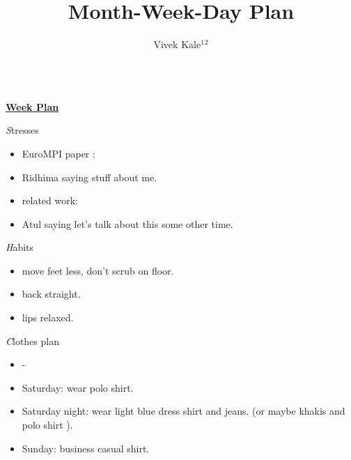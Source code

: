 \documentclass[serif,mathserif,final]{beamer}
\title{Month-Week-Day Plan}
\author{Vivek Kale$^1$$^2$}
\institute{$^1$ University of Illinois at Urbana-Champaign \quad}
\begin{document}
 
\begin{frame}{}
  \begin{columns}[t]


\begin{column}{0.27\linewidth} {\textbf{\underline{Week Plan}}} 

  \begin{block}{\textit Stresses} 
    \begin{itemize}
    \item \small EuroMPI paper : 
      \small \item \small Ridhima saying stuff about me. 
    \item \small related work:   
    \item \small Atul saying let's talk about this some other time. 
    \end{itemize} 
  \end{block} 

  \begin{block}{\textit Habits } 
    \begin{itemize} 
      \small \item \small move feet less, don't scrub on floor. 
    \item \small back straight. 
    \item \small lips relaxed. 
    \end{itemize} 
  \end{block} 

  \begin{block}{\textit Clothes plan } 
    \begin{itemize} 
      \small \item \small - 
    \item \small Saturday: wear polo shirt. 
    \item \small Saturday night: wear light blue dress shirt and jeans. (or maybe khakis and polo shirt ). 
    \item \small Sunday: business casual shirt. 
    \end{itemize} 
  \end{block} 


\end{column}
\end{columns}
\end{frame}
\end{document}
